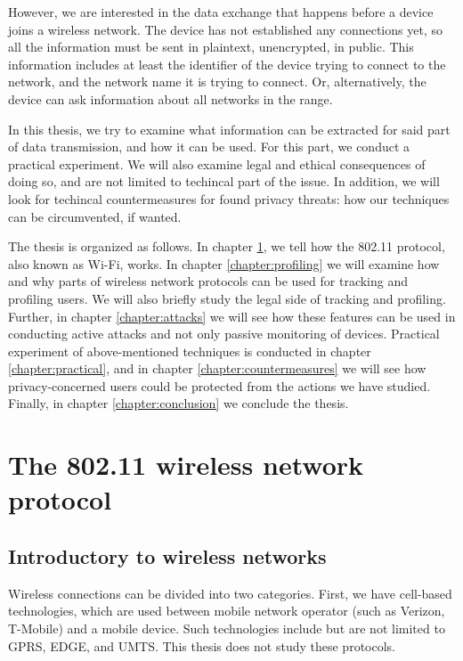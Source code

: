 \documentclass[12pt,a4paper,oneside,pdftex]{report}
\begin{document}
However, we are interested in the data exchange that happens before a device joins a wireless network. The device has not established any connections yet, so all the information must be sent in plaintext, unencrypted, in public. This information includes at least the identifier of the device trying to connect to the network, and the network name it is trying to connect. Or, alternatively, the device can ask information about all networks in the range.


In this thesis, we try to examine what information can be extracted for said part of data transmission, and how it can be used. For this part, we conduct a practical experiment. We will also examine legal and ethical consequences of doing so, and are not limited to techincal part of the issue. In addition, we will look for techincal countermeasures for found privacy threats: how our techniques can be circumvented, if wanted.

The thesis is organized as follows. In chapter \ref{chapter:protocol}, we tell how the 802.11 protocol, also known as Wi-Fi, works. In chapter \ref{chapter:profiling} we will examine how and why parts of wireless network protocols can be used for tracking and profiling users. We will also briefly study the legal side of tracking and profiling. Further, in chapter \ref{chapter:attacks} we will see how these features can be used in conducting active attacks and not only passive monitoring of devices. Practical experiment of above-mentioned techniques is conducted in chapter \ref{chapter:practical}, and in chapter \ref{chapter:countermeasures} we will see how privacy-concerned users could be protected from the actions we have studied. Finally, in chapter \ref{chapter:conclusion} we conclude the thesis.




\chapter{The 802.11 wireless network protocol}
\label{chapter:protocol}


\section{Introductory to wireless networks}
\label{sec:intro_wireless}

Wireless connections can be divided into two categories. First, we have cell-based technologies, which are used between mobile network operator (such as Verizon, T-Mobile) and a mobile device. Such technologies include but are not limited to GPRS, EDGE, and UMTS. This thesis does not study these protocols.
\end{document}
